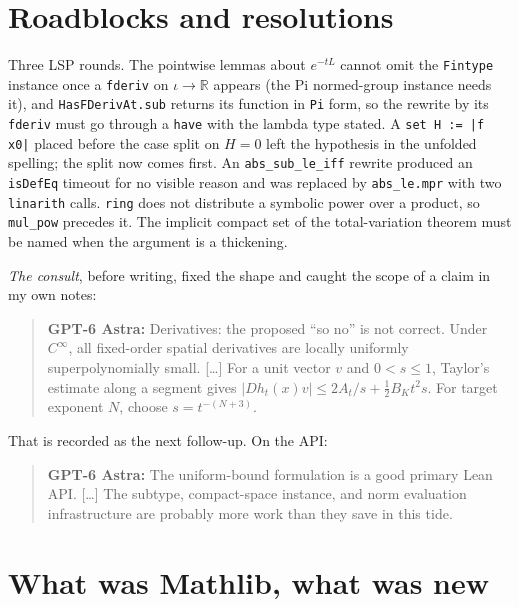 \documentclass[11pt]{article}
\newcommand{\R}{\mathbb{R}}
\newcommand{\code}[1]{\texttt{#1}}
\newcommand{\gptbox}[1]{\par\medskip\begin{quote}\small\textbf{\textcolor{green!50!black}{GPT-6 Astra:}} #1\end{quote}\medskip}
\begin{document}
\section{Roadblocks and resolutions}

Three LSP rounds. The pointwise lemmas about $e^{-tL}$ cannot omit the
\code{Fintype} instance once a \code{fderiv} on $\iota \to \R$ appears
(the Pi normed-group instance needs it), and \code{HasFDerivAt.sub}
returns its function in \code{Pi} form, so the rewrite by its
\code{fderiv} must go through a \code{have} with the lambda type stated.
A \code{set H := |f x0|} placed before the case split on $H = 0$ left the
hypothesis in the unfolded spelling; the split now comes first. An
\code{abs\_sub\_le\_iff} rewrite produced an \code{isDefEq} timeout for no
visible reason and was replaced by \code{abs\_le.mpr} with two
\code{linarith} calls. \code{ring} does not distribute a symbolic power
over a product, so \code{mul\_pow} precedes it. The implicit compact set
of the total-variation theorem must be named when the argument is a
thickening.

\emph{The consult}, before writing, fixed the shape and caught the scope
of a claim in my own notes:
\gptbox{Derivatives: the proposed ``so no'' is not correct. Under
$C^\infty$, all fixed-order spatial derivatives are locally uniformly
superpolynomially small. [\ldots] For a unit vector $v$ and $0 < s \le
1$, Taylor's estimate along a segment gives $|Dh_t(x)v| \le 2A_t/s +
\tfrac12 B_K t^2 s$. For target exponent $N$, choose $s = t^{-(N+3)}$.}
That is recorded as the next follow-up. On the API:
\gptbox{The uniform-bound formulation is a good primary Lean API. [\ldots]
The subtype, compact-space instance, and norm evaluation infrastructure
are probably more work than they save in this tide.}

\section{What was Mathlib, what was new}
\end{document}
